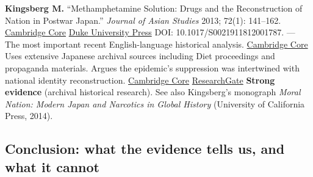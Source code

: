 \textbf{Kingsberg M.} ``Methamphetamine Solution: Drugs and the Reconstruction of Nation in Postwar Japan.'' \emph{Journal of Asian Studies} 2013; 72(1): 141--162. \href{https://www.cambridge.org/core/journals/journal-of-asian-studies/article/abs/methamphetamine-solution-drugs-and-the-reconstruction-of-nation-in-postwar-japan/0A0FCE7E74AE7D1ECE9A134114773CE6}{Cambridge Core} \href{https://read.dukeupress.edu/journal-of-asian-studies/article-abstract/72/1/141/325329/Methamphetamine-Solution-Drugs-and-the}{Duke University Press} DOI: 10.1017/S0021911812001787. --- The most important recent English-language historical analysis. \href{https://www.cambridge.org/core/journals/journal-of-asian-studies/article/abs/methamphetamine-solution-drugs-and-the-reconstruction-of-nation-in-postwar-japan/0A0FCE7E74AE7D1ECE9A134114773CE6}{Cambridge Core} Uses extensive Japanese archival sources including Diet proceedings and propaganda materials. Argues the epidemic's suppression was intertwined with national identity reconstruction. \href{https://www.cambridge.org/core/journals/journal-of-asian-studies/article/abs/methamphetamine-solution-drugs-and-the-reconstruction-of-nation-in-postwar-japan/0A0FCE7E74AE7D1ECE9A134114773CE6}{Cambridge Core} \href{https://www.researchgate.net/publication/282513182_The_forgotten_success_story_Japan_and_the_methamphetamine_problem}{ResearchGate} \textbf{Strong evidence} (archival historical research). See also Kingsberg's monograph \emph{Moral Nation: Modern Japan and Narcotics in Global History} (University of California Press, 2014).

\subsection{Conclusion: what the evidence tells us, and what it cannot}\label{12_philopon-conclusion-what-the-evidence-tells-us-and-what-it-cannot}

